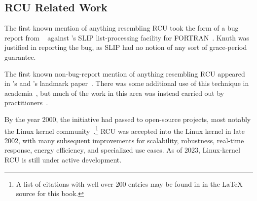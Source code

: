 
\subsection{RCU Related Work}
\label{sec:defer:RCU Related Work}

The first known mention of anything resembling RCU took the form of a bug
report from
~\cite[page 413 of Fundamental Algorithms]{Knuth73}
against 's SLIP list-processing facility for
FORTRAN~\cite{Weizenbaum:1963:SLP:367593.367617}.
Knuth was justified in reporting the bug, as SLIP had no notion of
any sort of grace-period guarantee.

The first known non-bug-report mention of anything resembling RCU appeared
in 's and 's landmark
paper~\cite{Kung80}.
There was some additional use of this technique in
academia~\cite{Manber82,Manber84,BarbaraLiskov1988ArgusCACM,Pugh90,Andrews91textbook,Pu95a,Cowan96a,Rastogi:1997:LPV:645923.671017,Gamsa99},
but much of the work in this area was instead carried out by
practitioners~\cite{RichardRashid87a,Hennessy89,Jacobson93,AjuJohn95,Slingwine95,Slingwine97,Slingwine98,McKenney98}.

\QuickQuizEnd

By the year 2000, the initiative had passed to open-source projects,
most notably the Linux kernel
community~\cite{RustyRussell2000a,RustyRussell2000b,McKenney01b,McKenney01a,McKenney02a,Arcangeli03}.\footnote{
	A list of citations with well over 200 entries may be found in
	 in the {\LaTeX} source for this book.}
RCU was accepted into the Linux kernel in late 2002, with many subsequent
improvements for scalability, robustness, real-time response, energy
efficiency, and specialized use cases.
As of 2023, Linux-kernel RCU is still under active development.

